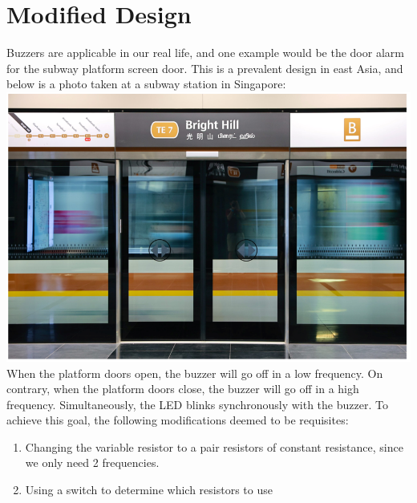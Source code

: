 \documentclass{article}
\begin{document}
	\section{Modified Design}
	Buzzers are applicable in our real life, and one example would be the door alarm for the subway platform screen door. This is a prevalent design in east Asia, and below is a photo taken at a subway station in Singapore:\newline
	\includegraphics[width=\columnwidth]{SUBW}
	When the platform doors open, the buzzer will go off in a low frequency. On contrary, when the platform doors close, the buzzer will go off in a high frequency. Simultaneously, the LED blinks synchronously with the buzzer. \newline
	To achieve this goal, the following modifications deemed to be requisites:
	\begin{enumerate}
		\item Changing the variable resistor to a pair resistors of constant resistance, since we only need 2 frequencies.
		\item Using a switch to determine which resistors to use
	\end{enumerate}
\end{document}
